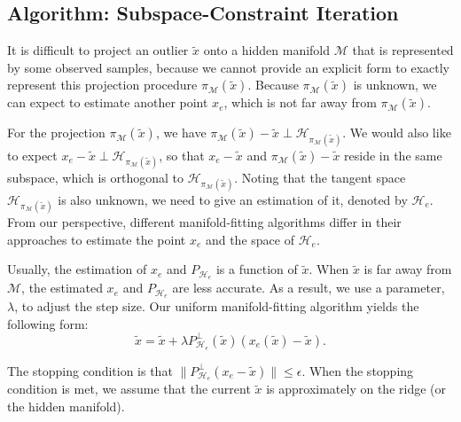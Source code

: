 \documentclass[aos,preprint]{imsart}
\theoremstyle{remark}
\begin{document}
\subsection{Algorithm: Subspace-Constraint Iteration}
It is difficult to project an outlier $\tilde{x}$ onto a hidden manifold $\mathcal M$ that is represented by some observed samples, because we cannot provide an explicit form to exactly represent this projection procedure $\pi_{\mathcal M}(\tilde{x})$. Because $\pi_{\mathcal M}(\tilde{x})$ is unknown, we can expect to estimate another point $x_e$, which is not far away from $\pi_{\mathcal M}(\tilde{x})$. 

For the projection $\pi_{\mathcal M}(\tilde{x})$, we have $\pi_{\mathcal M}(\tilde{x})-\tilde{x} \perp {\mathcal H}_{\pi_{\mathcal M}(\tilde{x})}$. We would also like to expect $x_e-\tilde{x}\perp {\mathcal H}_{\pi_{\mathcal M}(\tilde{x})}$, so that $x_e-\tilde{x}$ and $\pi_{\mathcal M}(\tilde{x})-\tilde{x}$ reside in the same subspace, which is orthogonal to ${\mathcal H}_{\pi_{\mathcal M}(\tilde{x})}$. Noting that the tangent space ${\mathcal H}_{\pi_{\mathcal M}(\tilde{x})}$ is also unknown, we need to give an estimation of it, denoted by ${\mathcal H}_e$.
From our perspective, different manifold-fitting algorithms differ in their approaches to estimate the point $x_e$ and the space of ${\mathcal H}_e$.

Usually, the estimation of $x_e$ and $P_{{\mathcal H}_e}$ is a function of $\tilde{x}$. When $\tilde{x}$ is far away from $\mathcal M$, the estimated $x_e$ and $P_{{\mathcal H}_e}$ are less accurate. As a result, we use a parameter, $\lambda$, to adjust the step size. Our uniform manifold-fitting algorithm yields the following form:
\[
\tilde{x} = \tilde{x} +\lambda P_{{\mathcal H}_e}^{\perp}(\tilde{x})(x_e(\tilde{x})-\tilde{x}).
\]

The stopping condition is that $\|P_{{\mathcal H}_e}^{\perp}(x_e-\tilde{x})\|\leq \epsilon$. When the stopping condition is met, we assume that the current $\tilde{x}$ is approximately on the ridge (or the hidden manifold).
\end{document}
